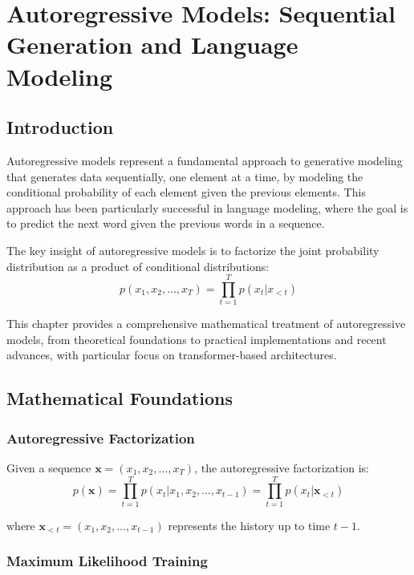 \chapter{Autoregressive Models: Sequential Generation and Language Modeling}

\section{Introduction}

Autoregressive models represent a fundamental approach to generative modeling that generates data sequentially, one element at a time, by modeling the conditional probability of each element given the previous elements. This approach has been particularly successful in language modeling, where the goal is to predict the next word given the previous words in a sequence.

The key insight of autoregressive models is to factorize the joint probability distribution as a product of conditional distributions:
\begin{equation}
    p(x_1, x_2, \ldots, x_T) = \prod_{t=1}^T p(x_t | x_{<t})
\end{equation}

This chapter provides a comprehensive mathematical treatment of autoregressive models, from theoretical foundations to practical implementations and recent advances, with particular focus on transformer-based architectures.

\section{Mathematical Foundations}

\subsection{Autoregressive Factorization}

Given a sequence $\mathbf{x} = (x_1, x_2, \ldots, x_T)$, the autoregressive factorization is:
\begin{equation}
    p(\mathbf{x}) = \prod_{t=1}^T p(x_t | x_1, x_2, \ldots, x_{t-1}) = \prod_{t=1}^T p(x_t | \mathbf{x}_{<t})
\end{equation}

where $\mathbf{x}_{<t} = (x_1, x_2, \ldots, x_{t-1})$ represents the history up to time $t-1$.

\subsection{Maximum Likelihood Training}

